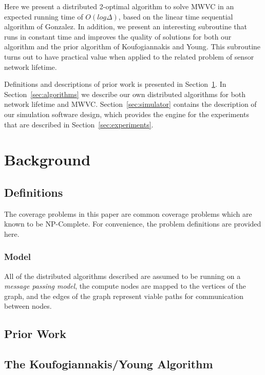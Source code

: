 Here we present a distributed 2-optimal algorithm to solve MWVC in an expected running time of $O(log\Delta)$, based on the linear time sequential algorithm of Gonzalez\cite{Gonzalez1995129}. In addition, we present an interesting subroutine that runs in constant time and improves the quality of solutions for both our algorithm and the prior algorithm of Koufogiannakis and Young\cite{1582746}. This subroutine turns out to have practical value when applied to the related problem of sensor network lifetime.

Definitions and descriptions of prior work is presented in Section~\ref{sec:background}. In Section~\ref{sec:algorithms} we describe our own distributed algorithms for both network lifetime and MWVC. Section~\ref{sec:simulator} contains the description of our simulation software design, which provides the engine for the experiments that are described in Section~\ref{sec:experiments}.

\section{Background}
\label{sec:background}
\subsection{Definitions}
The coverage problems in this paper are common coverage problems which are known to be NP-Complete. For convenience, the problem definitions are provided here.




\subsubsection{Model}
\label{ssb:com-model}

All of the distributed algorithms described are assumed to be running on a {\em message passing model}, the compute nodes are mapped to the vertices of the graph, and the edges of the graph represent viable paths for communication between nodes. 

\subsection{Prior Work}



\subsection{The Koufogiannakis/Young Algorithm}
\label{sec:k-y-alg}

